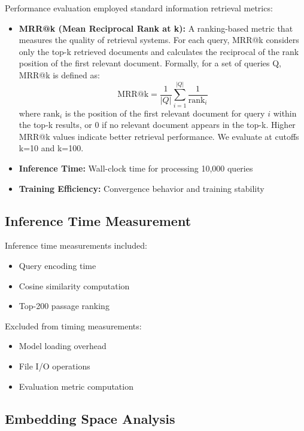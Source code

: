 Performance evaluation employed standard information retrieval metrics:

\begin{itemize}
\item \textbf{MRR@k (Mean Reciprocal Rank at k):} A ranking-based metric that measures the quality of retrieval systems. For each query, MRR@k considers only the top-k retrieved documents and calculates the reciprocal of the rank position of the first relevant document. Formally, for a set of queries Q, MRR@k is defined as:
\begin{equation}
\text{MRR@k} = \frac{1}{|Q|} \sum_{i=1}^{|Q|} \frac{1}{\text{rank}_i}
\end{equation}
where $\text{rank}_i$ is the position of the first relevant document for query $i$ within the top-k results, or 0 if no relevant document appears in the top-k. Higher MRR@k values indicate better retrieval performance. We evaluate at cutoffs k=10 and k=100.

\item \textbf{Inference Time:} Wall-clock time for processing 10,000 queries
\item \textbf{Training Efficiency:} Convergence behavior and training stability
\end{itemize}

\subsection{Inference Time Measurement}

Inference time measurements included:
\begin{itemize}
\item Query encoding time
\item Cosine similarity computation
\item Top-200 passage ranking
\end{itemize}

Excluded from timing measurements:
\begin{itemize}
\item Model loading overhead
\item File I/O operations  
\item Evaluation metric computation
\end{itemize}

\subsection{Embedding Space Analysis}

